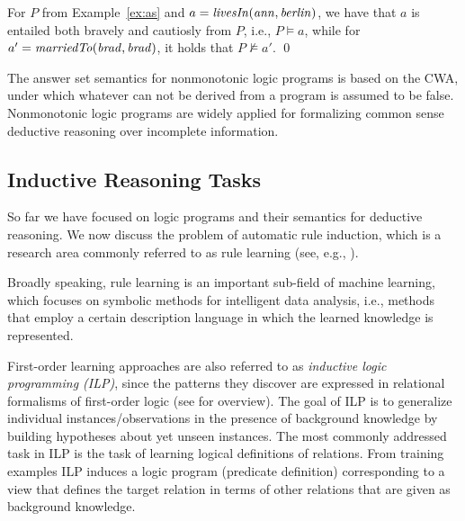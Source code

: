 \begin{example}
For $P$ from Example~\ref{ex:as} and $a=\mathit{livesIn(ann,berlin)}$, we have that $a$ is entailed both bravely and cautiosly from $P$, i.e., $P\models a$, while for $a'=\mathit{marriedTo(brad,brad)}$, it holds that $P \not \models a'$. \qed
\end{example}

The answer set semantics for nonmonotonic logic programs is based on the CWA, under which whatever can not be derived from a program is assumed to be false. Nonmonotonic logic programs are widely applied for formalizing common sense deductive reasoning over incomplete information.



\subsection{Inductive Reasoning Tasks}
\label{sec:rules_learning_tasks}

So far we have focused on logic programs and their semantics for deductive reasoning. We now discuss the problem of automatic rule induction, which is a research area commonly referred to as rule learning (see, e.g., \cite{DBLP:books/daglib/0021868,DBLP:series/cogtech/FurnkranzGL12}). 

Broadly speaking, rule learning is an important sub-field of machine learning, which focuses on symbolic methods for intelligent data analysis, i.e., methods that employ a certain description language in which the learned knowledge is represented. %

First-order learning approaches are also referred to as %
 \emph{inductive logic programming (ILP)}, since the patterns they discover are expressed in
relational formalisms of first-order logic (see \cite{DBLP:books/daglib/0021868} for overview).
The goal of ILP is to generalize individual instances/observations in the presence of background knowledge by building
hypotheses about yet unseen instances. The most commonly addressed task in ILP is the task
of learning logical definitions of relations. From training examples ILP induces a
logic program (predicate definition) corresponding to a view
that defines the target relation in terms of other relations
that are given as background knowledge. 

